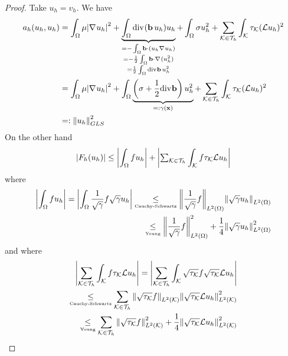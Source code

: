 \begin{proof}
    Take \(u_h = v_h\). We have 
    \begin{align*}
        a_h(u_h, u_h) &= \int_\Omega \mu\abs{\grad u_h}^2 + \underbrace{\int_\Omega \div(\vect{b}\,u_h) u_h}_{\mathclap{\substack{=-\int_\Omega \vect{b}\cdot (u_h \grad u_h) \\ = -\frac{1}{2}\int_\Omega \vect{b}\cdot \grad(u^2_h) \\ =\frac{1}{2} \int_\Omega \div \vect{b} \, u^2_h}}} +\int_\Omega \sigma u^2_h + \sum_{\element \in \triangulation} \int_\element \tau_\element (\mathcal{L}u_h)^2 \\
        &= \int_\Omega \mu \abs{\grad u_h}^2 + \int_\Omega \underbrace{\left( \sigma + \frac{1}{2} \div \vect{b} \right)u_h^2}_{=: \gamma(\vect{x})} + \sum_{\element \in \triangulation} \int_\element \tau_\element(\mathcal{L}u_h)^2 \\
        &=: \norm{u_h}_{GLS}^2
    \end{align*}
    On the other hand
    \[
        \abs{F_h(u_h)} \leq \abs{\int_\Omega f u_h} + \abs{{\textstyle \sum_{\mathcal{K} \in \mathcal{T}_h}}\int_{\mathcal{K}} f \tau_{\mathcal{K}} \mathcal{L}u_h}
    \]
    where 
    \begin{equation*}
        \begin{split}
            \abs{\int_\Omega f u_h} = \abs{\int_\Omega \frac{1}{\sqrt{\gamma}} f \sqrt{\gamma}u_h} \underset{\text{\tiny{Cauchy-Schwartz}}}{\leq} \norm{\frac{1}{\sqrt{\gamma}}f}_{L^2(\Omega)} \norm{\sqrt{\gamma}u_h}_{L^2(\Omega)} \\
            \underset{\text{\tiny Young}}{\leq} \norm{\frac{1}{\sqrt{\gamma}}f}_{L^2(\Omega)}^2 + \frac{1}{4} \norm{\sqrt{\gamma}u_h}_{L^2(\Omega)}^2
        \end{split}
    \end{equation*}
    and where 
    \begin{equation*}
        \begin{split}
            \abs{\sum_{\element \in \triangulation} \int_\element f \tau_\element \mathcal{L}u_h} = \abs{\sum_{\element \in \triangulation} \int_\element \sqrt{\tau_\element} f \sqrt{\tau_\element}\mathcal{L}u_h} \\
            \underset{\txt{\tiny Cauchy-Schwartz}}{\leq} \sum_{\element\in\triangulation}\norm{\sqrt{\tau_\element}f}_{L^2(\element)}\norm{\sqrt{\tau_\element} \mathcal{L}u_h}^2_{L^2(\element)} \\
            \underset{\txt{\tiny Young}}{\leq} \sum_{\element\in\triangulation}\norm{\sqrt{\tau_\element}f}_{L^2(\element)}^2 +\frac{1}{4} \norm{\sqrt{\tau_\element} \mathcal{L}u_h}^2_{L^2(\element)} \\

\end{split}
\end{equation*}
\end{proof}
